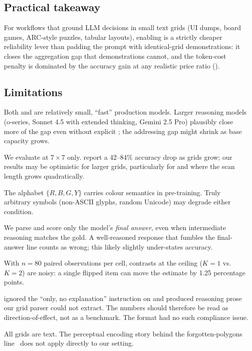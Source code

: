 \subsection{Practical takeaway}

For workflows that ground LLM decisions in small text grids (UI dumps,
board games, ARC-style puzzles, tabular layouts), enabling \COT is a
strictly cheaper reliability lever than padding the prompt with
identical-grid demonstrations: it closes the aggregation gap that
demonstrations cannot, and the token-cost penalty is dominated by the
accuracy gain at any realistic price ratio ().

\subsection{Limitations}

Both \gpt and \haiku are relatively small, ``fast'' production models.
Larger reasoning models (o-series, Sonnet 4.5 with extended thinking,
Gemini 2.5 Pro) plausibly close more of the gap even without
explicit \COT; the addressing gap might shrink as base capacity grows.

We evaluate at $7{\times}7$ only. \citet{bai2025matrix} report a
42--84\% accuracy drop as grids grow; our results may be optimistic for
larger grids, particularly for \qcount and \qrowmax where the scan
length grows quadratically.

The alphabet $\{R, B, G, Y\}$ carries colour semantics in pre-training.
Truly arbitrary symbols (non-ASCII glyphs, random Unicode) may degrade
either condition.

We parse and score only the model's \emph{final answer}, even when \COT
intermediate reasoning matches the gold. A well-reasoned response that
fumbles the final-answer line counts as wrong; this likely slightly
under-states \COT accuracy.

With $n{=}80$ paired observations per cell, contrasts at the ceiling
(\eg \COT $K{=}1$ vs.\ $K{=}2$) are noisy: a single flipped item can
move the estimate by 1.25 percentage points.

\haiku ignored the ``\Direct only, no explanation'' instruction on
\miniarc and produced reasoning prose our grid parser could not
extract. The \miniarc numbers should therefore be read as
direction-of-effect, not as a benchmark. The \addrtask format had no
such compliance issue.

All grids are text. The perceptual encoding story behind the
forgotten-polygons line~\citep{rudman2025polygons} does not apply
directly to our setting.
